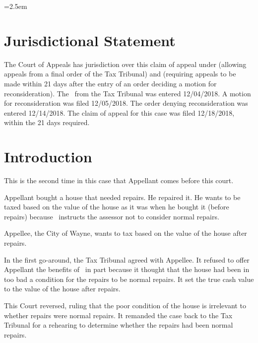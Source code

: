 \documentclass[12pt,\documentclassflag]{michiganCourtOfAppealsBrief}
\def\mathieuGast{\pincite[l]{MCL}{211.27(2)}}
\begin{document}
\tableofcontents

\newpage
\tableofauthorities

\pagestyle{plain}



\parindent=2.5em 
\doublespacing

\section{Jurisdictional Statement}

The Court of Appeals has jurisdiction over this claim of appeal under  (allowing appeals from a final order of the Tax Tribunal) and  (requiring appeals to be made within 21 days after the entry of an order deciding a motion for reconsideration). The \FOJ\ from the Tax Tribunal was entered 12/04/2018. A motion for reconsideration was filed 12/05/2018. The order denying reconsideration was entered 12/14/2018. The claim of appeal for this case was filed 12/18/2018, within the 21 days required.

\section{Introduction}

This is the second time in this case that Appellant comes before this court. 

Appellant bought a house that needed repairs. He repaired it. He wants to be taxed based on the value of the house as it was when he bought it (before repairs) because  \mathieuGast\ instructs the assessor not to consider normal repairs. 

Appellee, the City of Wayne, wants to tax based on the value of the house after repairs.

In the first go-around, the Tax Tribunal agreed with Appellee. It refused to offer Appellant the benefits of \mathieuGast\ in part because it thought that the house had been in too bad a condition for the repairs to be normal repairs. It set the true cash value to the value of the house after repairs.

This Court reversed, ruling that the poor condition of the house is irrelevant to whether repairs were normal repairs. It remanded the case back to the Tax Tribunal for a rehearing to determine whether the repairs had been normal repairs. 
\end{document}
